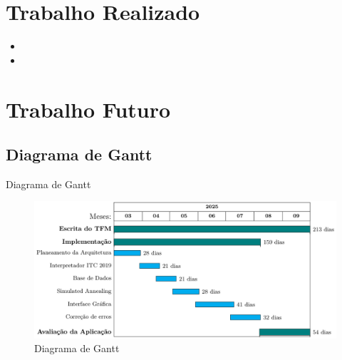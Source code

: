 \documentclass[11]{beamer}
\begin{document}
    \section{Trabalho Realizado}

    \begin{frame}
        \begin{itemize}
            \item 
            \item 
        \end{itemize}
    \end{frame}

    \section{Trabalho Futuro}

    \subsection{Diagrama de Gantt}

    \begin{frame}{Diagrama de Gantt}
        \begin{figure}
            \includegraphics[width=\linewidth]{img/Diagrama-Gantt.png}
            \caption{Diagrama de Gantt}
        \end{figure}
    \end{frame}

\end{document}
